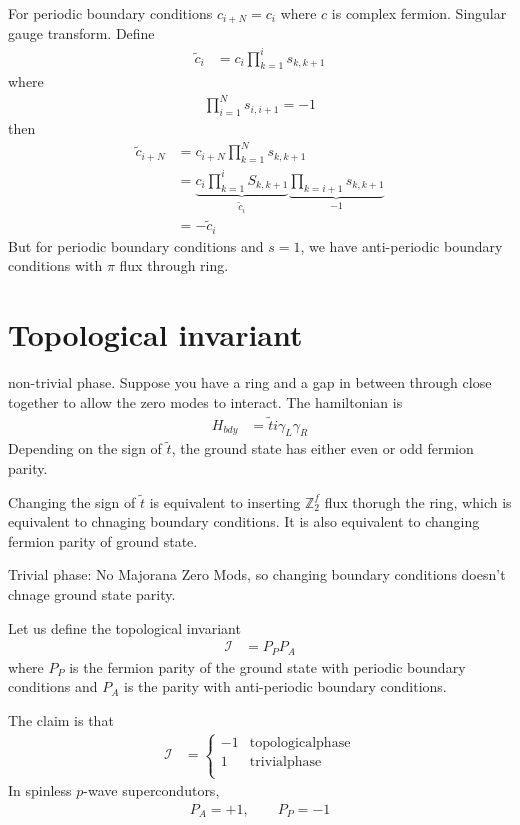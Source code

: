 \begin{example}
    For periodic boundary conditions $c_{i + N} = c_i$
    where $c$ is complex fermion.
    Singular gauge transform.
    Define
    \begin{align}
        \tilde{c}_i &=
        c_i \prod_{k=1}^{i} s_{k,k+1}
    \end{align}
    where
    \begin{align}
        \prod_{i=1}^{N} s_{i,i+1} = -1
    \end{align}
    then
    \begin{align}
        \tilde{c}_{i+N} &=
        c_{i + N} \prod_{k=1}^{N} s_{k, k+1}\\
        &=
        \underbrace{c_i \prod_{k = 1}^{i} S_{k, k + 1}}_{\tilde{c}_i}
        \underbrace{\prod_{k=i + 1} s_{k, k + 1}}_{-1}\\
        &=
        - \tilde{c}_i
    \end{align}
    But for periodic boundary conditions and $s=1$,
    we have anti-periodic boundary conditions with $\pi$ flux through ring.
\end{example}

\section{Topological invariant}
non-trivial phase.
Suppose you have a ring and a gap in between through close together to allow the
zero modes to interact.
The hamiltonian is
\begin{align}
    H_{bdy} &= \tilde{t} i \gamma_{L}\gamma_{R}
\end{align} 
Depending on the sign of $\tilde{t}$,
the ground state has either even or odd fermion parity.

Changing the sign of $\tilde{t}$ is equivalent to
inserting $\mathbb{Z}_2^f$ flux thorugh the ring,
which is equivalent to chnaging boundary conditions.
It is also equivalent to changing fermion parity of ground state.

Trivial phase:
No Majorana Zero Mods,
so changing boundary conditions
doesn't chnage ground state parity.

Let us define the topological invariant
\begin{align}
    \mathcal{I} &=
    P_P P_A
\end{align}
where $P_P$ is the fermion parity of the ground state with periodic boundary
conditions and $P_A$ is the parity with anti-periodic boundary conditions.

The claim is that
\begin{align}
    \mathcal{I} &=
    \begin{cases}
        -1 & \mathrm{topological phase}\\
        1 & \mathrm{trivial phase}\\
    \end{cases}
\end{align}
In spinless $p$-wave supercondutors,
\begin{align}
    P_A = + 1, \qquad P_P = -1
\end{align}

